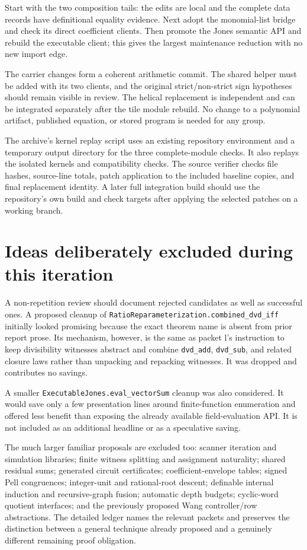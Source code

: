 \documentclass[11pt,letterpaper]{article}
\newcommand{\code}[1]{\nolinkurl{#1}}
\begin{document}
Start with the two composition tails: the edits are local and the complete data records have definitional equality evidence. Next adopt the monomial-list bridge and check its direct coefficient clients. Then promote the Jones semantic API and rebuild the executable client; this gives the largest maintenance reduction with no new import edge.

The carrier changes form a coherent arithmetic commit. The shared helper must be added with its two clients, and the original strict/non-strict sign hypotheses should remain visible in review. The helical replacement is independent and can be integrated separately after the tile module rebuild. No change to a polynomial artifact, published equation, or stored program is needed for any group.

The archive's kernel replay script uses an existing repository environment and a temporary output directory for the three complete-module checks. It also replays the isolated kernels and compatibility checks. The source verifier checks file hashes, source-line totals, patch application to the included baseline copies, and final replacement identity. A later full integration build should use the repository's own build and check targets after applying the selected patches on a working branch.

\section{Ideas deliberately excluded during this iteration}

A non-repetition review should document rejected candidates as well as successful ones. A proposed cleanup of \code{RatioReparameterization.combined_dvd_iff} initially looked promising because the exact theorem name is absent from prior report prose. Its mechanism, however, is the same as packet l's instruction to keep divisibility witnesses abstract and combine \code{dvd_add}, \code{dvd_sub}, and related closure laws rather than unpacking and repacking witnesses. It was dropped and contributes no savings.

A smaller \code{ExecutableJones.eval_vectorSum} cleanup was also considered. It would save only a few presentation lines around finite-function enumeration and offered less benefit than exposing the already available field-evaluation API. It is not included as an additional headline or as a speculative saving.

The much larger familiar proposals are excluded too: scanner iteration and simulation libraries; finite witness splitting and assignment naturality; shared residual sums; generated circuit certificates; coefficient-envelope tables; signed Pell congruences; integer-unit and rational-root descent; definable internal induction and recursive-graph fusion; automatic depth budgets; cyclic-word quotient interfaces; and the previously proposed Wang controller/row abstractions. The detailed ledger names the relevant packets and preserves the distinction between a general technique already proposed and a genuinely different remaining proof obligation.
\end{document}
